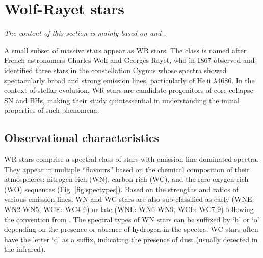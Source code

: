 

\section{Wolf-Rayet stars}\label{sect:wr_intro}

\textit{The content of this section is mainly based on \citet{crowther_physical_2007} and \citet{langer_presupernova_2012}.}

A small subset of massive stars appear as WR stars. The class is named after French astronomers Charles Wolf and Georges Rayet, who in 1867 observed and identified three stars in the constellation Cygnus whose spectra showed spectacularly broad and strong emission lines, particularly of He\,{\sc ii} $\lambda 4686$. In the context of stellar evolution, WR stars are candidate progenitors of core-collapse SN and BHs, making their study quintessential in understanding the initial properties of such phenomena.

\subsection{Observational characteristics}\label{sect:wr_obs_char}

WR stars comprise a spectral class of stars with emission-line dominated spectra. They appear in multiple ``flavours'' based on the chemical composition of their atmospheres: nitrogen-rich (WN), carbon-rich (WC), and the rare oxygen-rich (WO) sequences (Fig. \ref{fig:spectypes}). Based on the strengths and ratios of various emission lines, WN and WC stars are also sub-classified as early (WNE: WN2-WN5, WCE: WC4-6) or late (WNL: WN6-WN9, WCL: WC7-9) following the convention from \citet{smith_revised_1968}. The spectral types of WN stars can be suffixed by `h' or `o' depending on the presence or absence of hydrogen in the spectra. \b{WC stars often have the letter `d' as a suffix, indicating the presence of dust (usually detected in the infrared). }

